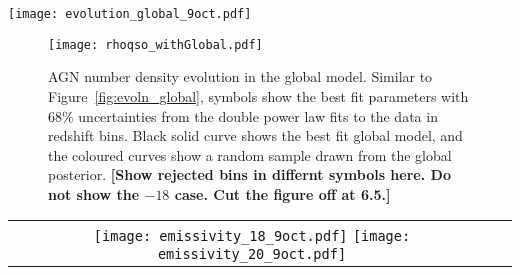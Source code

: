 \documentclass[a4paper,fleqn,usenatbib]{mnras}
\begin{document}
\begin{figure*}
  \begin{center}
    \texttt{[image: evolution\_global\_9oct.pdf]}
  \end{center}
  \caption{Luminosity function parameter evolution in the global
    model.  The symbols show the best fit parameters with 68\%
    uncertainties from the double power law fits to the data in
    redshift bins.  These points are identical to those in
    Figure~\ref{fig:evoln}, except that bins with BOSS qsos ($z\sim
    2$--$3$) are not shown.  In each panel, the black solid curve
    shows the best fit global model, and the coloured curves show a
    random sample drawn from the global posterior.}
  \label{fig:evoln_global}
\end{figure*}

\begin{figure}
  \begin{center}
    \texttt{[image: rhoqso\_withGlobal.pdf]}
  \end{center}
  \caption{AGN number density evolution in the global model.  Similar
    to Figure~\ref{fig:evoln_global}, symbols show the best fit
    parameters with 68\% uncertainties from the double power law fits
    to the data in redshift bins.  Black solid curve shows the best
    fit global model, and the coloured curves show a random sample
    drawn from the global posterior.  \textbf{[Show rejected bins in
        differnt symbols here.  Do not show the $-18$ case.  Cut the
        figure off at 6.5.]}}
  \label{fig:rhoqso}
\end{figure}

\begin{figure*}
  \begin{center}
    \begin{tabular}{cc}
    \texttt{[image: emissivity\_18\_9oct.pdf]}
    \texttt{[image: emissivity\_20\_9oct.pdf]}
    \end{tabular}
  \end{center}
  \caption{LyC emissivity of AGN assuming 100\% escape fraction.
    Model luminosity functions are integrated down to $M_{1450}=-18$
    in the left panel and $-20$ in the right panel.  For comparison,
    various other published determinations of the 1~Ry emissivity of
    quasars are also shown in both panels of Figure~\ref{fig:e912}.
    The blue curve in these panels shows the AGN 1~Ry emissivity model
    of \citet{2012ApJ...746..125H}, which is very similar to the model
    of \citet{2007ApJ...654..731H}.  The red symbols with error bars
    show the determination from the fits of
    \citet{2015AA...578A..83G}.  The maroon curve is the published fit
    to the 1~Ry emissivity evolution in the fits of
    \citet{2017MNRAS.466.1160M}.  The green curve is the model of
    \citet{2015ApJ...813L...8M}.}
  \label{fig:e912}
\end{figure*}
\end{document}
